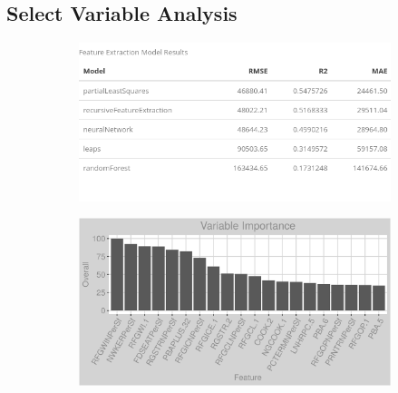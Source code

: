 \subsection{Select Variable Analysis}
\label{appendix:electricity:sva}
\begin{figure}[h]
\centering
\begin{subfigure}{0.8\textwidth}
\centering
\includegraphics[width=.99\textwidth, height=0.3\textheight]{Images/electricity_psf_fe_summary.png}
\end{subfigure}
\begin{subfigure}{1\textwidth}
\centering
\includegraphics[width=.99\textwidth, height=0.45\textheight]{Images/electricity_psf_all_vars.png}
\end{subfigure}
\end{figure}
\FloatBarrier
\newpage
